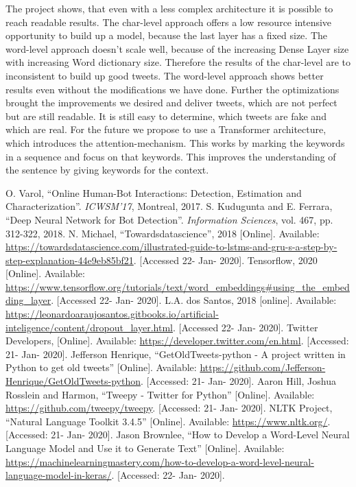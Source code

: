 \documentclass[conference]{IEEEtran}
\begin{document}
The project shows, that even with a less complex architecture it is possible to reach readable results. The char-level approach offers a low resource intensive opportunity to
build up a model, because the last layer has a fixed size. The word-level approach doesn’t scale well, because of the increasing Dense Layer size with increasing Word dictionary size. Therefore the results of the char-level are to inconsistent to build up good tweets. The word-level approach shows better results even without the modifications we have done. Further the optimizations brought the improvements we desired and deliver tweets, which are not perfect but are still readable. It is still easy to determine, which tweets are fake and which are real. For the future we propose to use a Transformer architecture, which introduces the attention-mechanism. This works by marking the keywords in a sequence and focus on that keywords. This improves the understanding of the sentence by giving keywords for the context.


\begin{thebibliography}{00}
 O. Varol, ``Online Human-Bot Interactions: Detection, Estimation and Characterization''. \textit{ICWSM'17}, Montreal, 2017.
 S. Kudugunta and E. Ferrara, ``Deep Neural Network for Bot Detection''. \textit{Information Sciences}, vol. 467, pp. 312-322, 2018.
 N. Michael, ``Towardsdatascience'', 2018 [Online]. Available: \url{https://towardsdatascience.com/illustrated-guide-to-lstms-and-gru-s-a-step-by-step-explanation-44e9eb85bf21}. [Accessed 22- Jan- 2020].
 Tensorflow, 2020 [Online]. Available: \url{https://www.tensorflow.org/tutorials/text/word_embeddings#using_the_embedding_layer}. [Accessed 22- Jan- 2020].
 L.A. dos Santos, 2018 [online]. Available: \url{https://leonardoaraujosantos.gitbooks.io/artificial-inteligence/content/dropout_layer.html}. [Accessed 22- Jan- 2020].
 Twitter Developers, [Online]. Available: \url{https://developer.twitter.com/en.html}. [Accessed: 21- Jan- 2020].
 Jefferson Henrique, ``GetOldTweets-python - A project written in Python to get old tweets'' [Online]. Available: \url{https://github.com/Jefferson-Henrique/GetOldTweets-python}. [Accessed: 21- Jan- 2020].
 Aaron Hill, Joshua Rosslein and Harmon, ``Tweepy - Twitter for Python'' [Online]. Available: \url{https://github.com/tweepy/tweepy}. [Accessed: 21- Jan- 2020].
 NLTK Project, ``Natural Language Toolkit 3.4.5'' [Online]. Available: \url{https://www.nltk.org/}. [Accessed: 21- Jan- 2020].
 Jason Brownlee, ``How to Develop a Word-Level Neural Language Model and Use it to Generate Text'' [Online]. Available: \url{https://machinelearningmastery.com/how-to-develop-a-word-level-neural-language-model-in-keras/}. [Accessed: 22- Jan- 2020].
\end{thebibliography}
\end{document}
